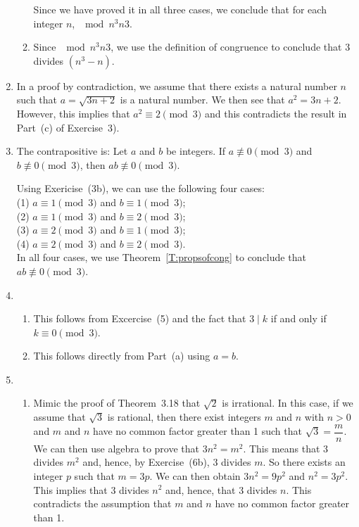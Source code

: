\begin{enumerate}
\begin{enumerate}
\noindent
Since we have proved it in all three cases, we conclude that for each integer $n$, $\mod{n^3}{n}{3}$.

\item Since $\mod{n^3}{n}{3}$, we use the definition of congruence to conclude that 3 divides $\left( n^3 - n \right)$.
\end{enumerate}





\item In a proof by contradiction, we assume that there exists a natural number $n$ such that 
$a = \sqrt{3n + 2}$ is a natural number.  We then see that $a^2 = 3n + 2$.  However, this implies that $a^2 \equiv 2 \pmod 3$ and this contradicts the result in Part~(c) of Exercise~3).



\item
The contrapositive is:  Let $a$ and $b$ be integers.  If $a \not\equiv 0 \pmod3$ and 
$b \not\equiv 0 \pmod 3$, then $ab \not\equiv 0 \pmod 3$.

Using Exericise~(3b), we can use the following four cases: \\ 
(1) $a \equiv 1 \pmod 3$ and $b \equiv 1 \pmod 3$; \\
(2) $a \equiv 1 \pmod 3$ and $b \equiv 2 \pmod 3$; \\
(3) $a \equiv 2 \pmod 3$ and $b \equiv 1 \pmod 3$; \\
(4) $a \equiv 2 \pmod 3$ and $b \equiv 2 \pmod 3$. \\
In all four cases, we use Theorem~\ref{T:propsofcong} to conclude that 
$ab \not\equiv 0 \pmod 3$.


\item \begin{enumerate}
\item This follows from Excercise~(5) and the fact that  $3 \mid k$ if and only if  
$k \equiv 0 \pmod 3$.
\item This follows directly from Part~(a) using $a = b$.
\end{enumerate}


\item \begin{enumerate}
\item Mimic the proof of Theorem~3.18 that $\sqrt{2}$ is irrational.  In this case, if we assume that $\sqrt{3}$ is rational, then there exist integers $m$ and $n$ with $n > 0$ and $m$ and $n$ have no common factor greater than 1 such that $\sqrt{3} = \dfrac{m}{n}$.  We can then use algebra to prove that $3n^2 = m^2$.  This means that 3 divides $m^2$ and, hence, by Exercise~(6b), 3 divides $m$.  So there exists an integer $p$ such that $m = 3p$.  We can then obtain $3n^2 = 9p^2$ and $n^2 = 3p^2$.  This implies that 3 divides $n^2$ and, hence, that 3 divides $n$.  This contradicts the assumption that $m$ and $n$ have no common factor greater than 1.


\end{enumerate}
\end{enumerate}
